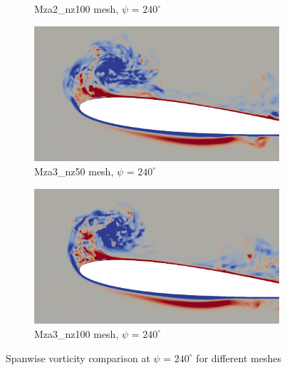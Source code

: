 \begin{figure}[H]
\begin{subfigure}[b]{0.475\textwidth}
		\caption{Mza2\_nz100 mesh, $\psi$ = $240^\circ$}
		\label{fig:Mza2_100_sp_psi240}
	\end{subfigure}
	\begin{subfigure}[b]{0.475\textwidth}
	\centering
	\includegraphics[width=1\textwidth]{figures/zonal_adapt_results/vorticity_plots/v2/Mza3_50/spavg/phase_240.png}
	\caption{Mza3\_nz50 mesh, $\psi$ = $240^\circ$}
	\label{fig:Mza3_50_sp_psi240}
\end{subfigure}
	\begin{subfigure}[b]{0.475\textwidth}
		\centering
		\includegraphics[width=1\textwidth]{figures/zonal_adapt_results/vorticity_plots/v2/Mza3_100/spavg/phase_240.png}
		\caption{Mza3\_nz100 mesh, $\psi$ = $240^\circ$}
		\label{fig:Mza3_100_sp_psi240}
	\end{subfigure}
	\caption{Spanwise vorticity comparison at $\psi$ = $240^\circ$ for different meshes}
	\label{fig:vorticity_zonal_240}
\end{figure}




